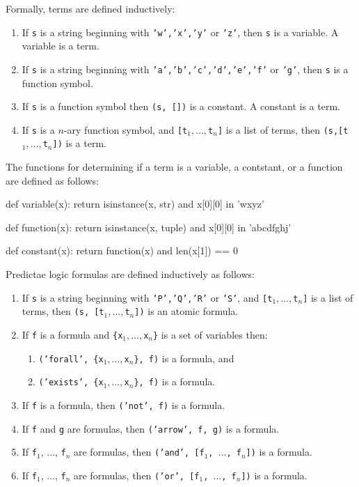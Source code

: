 \documentclass[a4paper,notitlepage]{scrartcl}
\begin{document}
Formally, terms are defined inductively:
\begin{enumerate}
\item If \texttt{s} is a string beginning with \texttt{'w','x','y'} or 
   \texttt{'z'}, then \texttt{s} is a variable.
A variable is a term.
\item If \texttt{s} is a string beginning with \texttt{'a','b','c','d','e','f'} 
   or \texttt{'g'}, then \texttt{s} is a function symbol.
\item If \texttt{s} is a function symbol then \texttt{(s, [])} is a constant.
A constant is a term.
\item  
If \texttt{s} is a $n$-ary function symbol, and \texttt{[t$_1,\ldots,$t$_n$]} 
   is a list of terms, then \texttt{(s,[t$_1,\ldots,$t$_n$])} is a term.
\end{enumerate}

The functions for determining if a term is a variable, a contstant, or a
   function are defined as follows:
\begin{code}
def variable(x):
    return isinstance(x, str) and x[0][0] in 'wxyz'

def function(x):
    return isinstance(x, tuple) and x[0][0] in 'abcdfghj'

def constant(x):
    return function(x) and len(x[1]) == 0 
\end{code}

Predictae logic formulas are defined inductively as follows:
\begin{enumerate}
\item If \texttt{s} is a string beginning with \texttt{'P','Q','R'} or \texttt{'S'}, and 
   \texttt{[t$_1,\ldots,$t$_n$]} is a list of terms, then \texttt{(s, [t$_1,
      \ldots, $t$_n$])} is an atomic formula.
\item If \texttt{f} is a formula and \texttt{\{x$_1,\ldots,$x$_n$\}} is a set of
   variables then:
   \begin{enumerate}
      \item \texttt{('forall', \{x$_1,\ldots,$x$_n$\}, f)} is a formula, and
      \item \texttt{('exists', \{x$_1,\ldots,$x$_n$\}, f)} is a formula.
   \end{enumerate}

\item
If \texttt{f} is a formula, then \texttt{('not', f)} is a formula.

\item
If \texttt{f} and \texttt{g} are formulas, then \texttt{('arrow', f, g)} is a
formula.

\item
If \texttt{f}$_1$, $\ldots$, \texttt{f}$_n$ are formulas, then \texttt{('and',
[f$_1$, $\ldots$, f$_n$])} is a formula.

\item
If \texttt{f}$_1$, $\ldots$, \texttt{f}$_n$ are formulas, then \texttt{('or',
[f$_1$, $\ldots$, f$_n$])} is a formula.
\end{enumerate}
\end{document}

